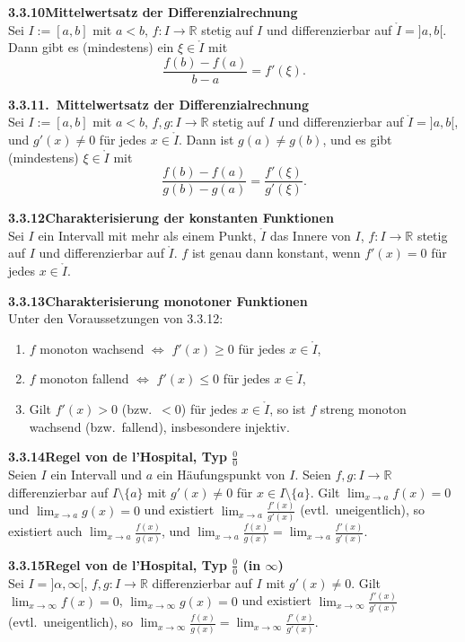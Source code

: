 \documentclass[a4paper,12pt]{article}
\newcommand{\gentry}[3]{%
  \noindent\textbf{#1\quad #2}\nopagebreak\\[0.2em]
  #3\par\smallskip
}
\begin{document}
\gentry{3.3.10}{Mittelwertsatz der Differenzialrechnung}{%
  Sei $I := [a, b]$ mit $a < b$, $f : I \to \mathbb{R}$ stetig auf $I$ und differenzierbar
  auf $\mathring I = ]a, b[$. Dann gibt es (mindestens) ein $\xi \in \mathring I$ mit
  \[
    \frac{f(b) - f(a)}{b - a} = f'(\xi).
  \]
}

\gentry{3.3.11}{2.~Mittelwertsatz der Differenzialrechnung}{%
  Sei $I := [a, b]$ mit $a < b$, $f, g : I \to \mathbb{R}$ stetig auf $I$ und
  differenzierbar auf $\mathring I = ]a, b[$, und $g'(x) \neq 0$ f\"ur jedes
  $x \in \mathring I$. Dann ist $g(a) \neq g(b)$, und es gibt (mindestens)
  $\xi \in \mathring I$ mit
  \[
    \frac{f(b) - f(a)}{g(b) - g(a)} = \frac{f'(\xi)}{g'(\xi)}.
  \]
}

\gentry{3.3.12}{Charakterisierung der konstanten Funktionen}{%
  Sei $I$ ein Intervall mit mehr als einem Punkt, $\mathring I$ das Innere von $I$,
  $f : I \to \mathbb{R}$ stetig auf $I$ und differenzierbar auf $\mathring I$.
  $f$ ist genau dann konstant, wenn $f'(x) = 0$ f\"ur jedes $x \in \mathring I$.
}

\gentry{3.3.13}{Charakterisierung monotoner Funktionen}{%
  Unter den Voraussetzungen von 3.3.12:
  \begin{enumerate}[label=(\roman*),topsep=2pt,itemsep=1pt]
    \item $f$ monoton wachsend $\Leftrightarrow$ $f'(x) \geq 0$ f\"ur jedes $x \in \mathring I$,
    \item $f$ monoton fallend $\Leftrightarrow$ $f'(x) \leq 0$ f\"ur jedes $x \in \mathring I$,
    \item Gilt $f'(x) > 0$ (bzw.\ $<0$) f\"ur jedes $x \in \mathring I$, so ist $f$
          streng monoton wachsend (bzw.\ fallend), insbesondere injektiv.
  \end{enumerate}
}

\gentry{3.3.14}{Regel von de l'Hospital, Typ $\tfrac{0}{0}$}{%
  Seien $I$ ein Intervall und $a$ ein H\"aufungspunkt von $I$. Seien $f, g : I \to \mathbb{R}$
  differenzierbar auf $I \setminus \{a\}$ mit $g'(x) \neq 0$ f\"ur $x \in I \setminus \{a\}$.
  Gilt $\lim_{x \to a} f(x) = 0$ und $\lim_{x \to a} g(x) = 0$ und existiert
  $\lim_{x \to a} \tfrac{f'(x)}{g'(x)}$ (evtl.\ uneigentlich), so existiert auch
  $\lim_{x \to a} \tfrac{f(x)}{g(x)}$, und
  $\lim_{x \to a} \tfrac{f(x)}{g(x)} = \lim_{x \to a} \tfrac{f'(x)}{g'(x)}$.
}

\gentry{3.3.15}{Regel von de l'Hospital, Typ $\tfrac{0}{0}$ (in $\infty$)}{%
  Sei $I = ]\alpha, \infty[$, $f, g : I \to \mathbb{R}$ differenzierbar auf $I$ mit
  $g'(x) \neq 0$. Gilt $\lim_{x \to \infty} f(x) = 0$, $\lim_{x \to \infty} g(x) = 0$ und
  existiert $\lim_{x \to \infty} \tfrac{f'(x)}{g'(x)}$ (evtl.\ uneigentlich),
  so $\lim_{x \to \infty} \tfrac{f(x)}{g(x)} = \lim_{x \to \infty} \tfrac{f'(x)}{g'(x)}$.
}
\end{document}
